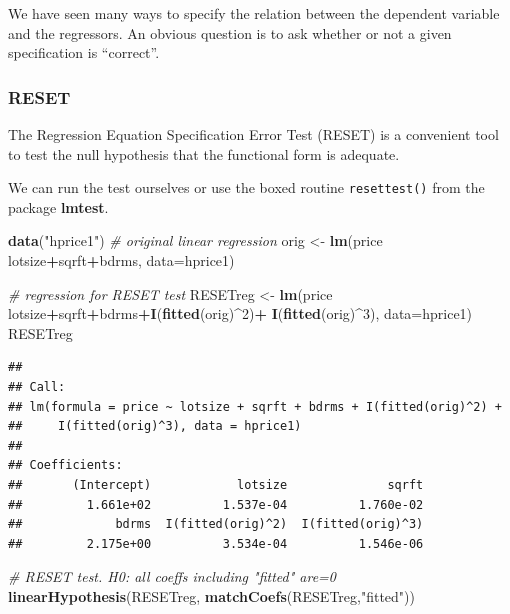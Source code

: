 \documentclass[]{book}
\newenvironment{Shaded}{\begin{snugshade}}{\end{snugshade}}
\newcommand{\CommentTok}[1]{\textcolor[rgb]{0.56,0.35,0.01}{\textit{#1}}}
\newcommand{\DataTypeTok}[1]{\textcolor[rgb]{0.13,0.29,0.53}{#1}}
\newcommand{\DecValTok}[1]{\textcolor[rgb]{0.00,0.00,0.81}{#1}}
\newcommand{\KeywordTok}[1]{\textcolor[rgb]{0.13,0.29,0.53}{\textbf{#1}}}
\newcommand{\NormalTok}[1]{#1}
\newcommand{\OperatorTok}[1]{\textcolor[rgb]{0.81,0.36,0.00}{\textbf{#1}}}
\newcommand{\StringTok}[1]{\textcolor[rgb]{0.31,0.60,0.02}{#1}}
\begin{document}
We have seen many ways to specify the relation between the dependent variable and the regressors. An obvious question is to ask whether or not a given specification is ``correct''.

\hypertarget{reset}{%
\subsubsection{RESET}\label{reset}}

The Regression Equation Specification Error Test (RESET) is a convenient tool to test the null hypothesis that the functional form is adequate.

We can run the test ourselves or use the boxed routine \texttt{resettest()} from the package \textbf{lmtest}.

\begin{Shaded}
\begin{Highlighting}[]
\KeywordTok{data}\NormalTok{(}\StringTok{"hprice1"}\NormalTok{)}
\CommentTok{# original linear regression}
\NormalTok{orig <-}\StringTok{ }\KeywordTok{lm}\NormalTok{(price }\OperatorTok{~}\StringTok{ }\NormalTok{lotsize}\OperatorTok{+}\NormalTok{sqrft}\OperatorTok{+}\NormalTok{bdrms, }\DataTypeTok{data=}\NormalTok{hprice1)}

\CommentTok{# regression for RESET test}
\NormalTok{RESETreg <-}\StringTok{ }\KeywordTok{lm}\NormalTok{(price }\OperatorTok{~}\StringTok{ }\NormalTok{lotsize}\OperatorTok{+}\NormalTok{sqrft}\OperatorTok{+}\NormalTok{bdrms}\OperatorTok{+}\KeywordTok{I}\NormalTok{(}\KeywordTok{fitted}\NormalTok{(orig)}\OperatorTok{^}\DecValTok{2}\NormalTok{)}\OperatorTok{+}\StringTok{ }
\StringTok{                 }\KeywordTok{I}\NormalTok{(}\KeywordTok{fitted}\NormalTok{(orig)}\OperatorTok{^}\DecValTok{3}\NormalTok{), }\DataTypeTok{data=}\NormalTok{hprice1)}
\NormalTok{RESETreg}
\end{Highlighting}
\end{Shaded}

\begin{verbatim}
## 
## Call:
## lm(formula = price ~ lotsize + sqrft + bdrms + I(fitted(orig)^2) + 
##     I(fitted(orig)^3), data = hprice1)
## 
## Coefficients:
##       (Intercept)            lotsize              sqrft  
##         1.661e+02          1.537e-04          1.760e-02  
##             bdrms  I(fitted(orig)^2)  I(fitted(orig)^3)  
##         2.175e+00          3.534e-04          1.546e-06
\end{verbatim}

\begin{Shaded}
\begin{Highlighting}[]
\CommentTok{# RESET test. H0: all coeffs including "fitted" are=0 }
\KeywordTok{linearHypothesis}\NormalTok{(RESETreg, }\KeywordTok{matchCoefs}\NormalTok{(RESETreg,}\StringTok{"fitted"}\NormalTok{))}
\end{Highlighting}
\end{Shaded}
\end{document}
